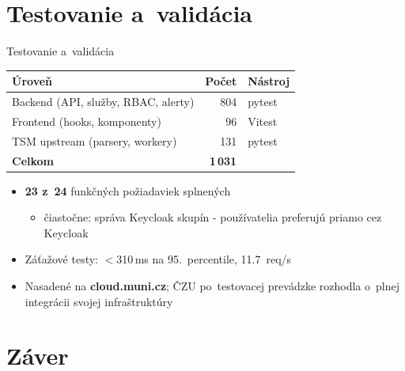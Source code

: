 \documentclass[]{beamer}
\begin{document}
\section{Testovanie a~validácia}

\begin{frame}{Testovanie a~validácia}
\begin{table}
  \small
  \begin{tabular}{l r l}
    \toprule
    \textbf{Úroveň} & \textbf{Počet} & \textbf{Nástroj} \\
    \midrule
    Backend (API, služby, RBAC, alerty) & 804 & pytest \\
    Frontend (hooks, komponenty)        &  96 & Vitest \\
    TSM upstream (parsery, workery)     & 131 & pytest \\
    \midrule
    \textbf{Celkom}                     & \textbf{1\,031} & \\
    \bottomrule
  \end{tabular}
\end{table}
\vspace{0.5em}
\begin{itemize}
  \item \textbf{23 z~24} funkčných požiadaviek \alert{splnených}
    \begin{itemize}
      \item[\tiny$\bullet$] čiastočne: správa Keycloak skupín
            - používatelia preferujú priamo cez Keycloak
    \end{itemize}
  \item Záťažové testy: $<$310\,ms na 95.~percentile,
        11{.}7~req/s
  \item Nasadené na \textbf{cloud.muni.cz}; ČZU po~testovacej prevádzke
        rozhodla o~plnej integrácii svojej infraštruktúry
\end{itemize}
\end{frame}

\section{Záver}
\end{document}
